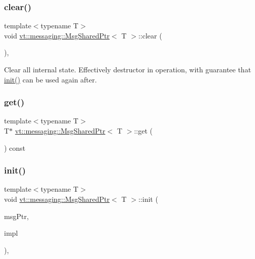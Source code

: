 \subsubsection{\texorpdfstring{clear()}{clear()}}
{\footnotesize\ttfamily template$<$typename T$>$ \\
void \hyperlink{structvt_1_1messaging_1_1_msg_shared_ptr}{vt\+::messaging\+::\+Msg\+Shared\+Ptr}$<$ T $>$\+::clear (\begin{DoxyParamCaption}{ }\end{DoxyParamCaption})\hspace{0.3cm}{\ttfamily [inline]}, {\ttfamily [private]}}

Clear all internal state. Effectively destructor in operation, with guarantee that \hyperlink{structvt_1_1messaging_1_1_msg_shared_ptr_a7117c1a8364c3267d4694b79a2f5cc6b}{init()} can be used again after. \mbox{\label{structvt_1_1messaging_1_1_msg_shared_ptr_a6e6e25e087e662d9171fa20b5092efdd}} 
\subsubsection{\texorpdfstring{get()}{get()}}
{\footnotesize\ttfamily template$<$typename T$>$ \\
T$\ast$ \hyperlink{structvt_1_1messaging_1_1_msg_shared_ptr}{vt\+::messaging\+::\+Msg\+Shared\+Ptr}$<$ T $>$\+::get (\begin{DoxyParamCaption}{ }\end{DoxyParamCaption}) const\hspace{0.3cm}{\ttfamily [inline]}}

\mbox{\label{structvt_1_1messaging_1_1_msg_shared_ptr_a7117c1a8364c3267d4694b79a2f5cc6b}} 
\subsubsection{\texorpdfstring{init()}{init()}}
{\footnotesize\ttfamily template$<$typename T$>$ \\
void \hyperlink{structvt_1_1messaging_1_1_msg_shared_ptr}{vt\+::messaging\+::\+Msg\+Shared\+Ptr}$<$ T $>$\+::init (\begin{DoxyParamCaption}\item[{T $\ast$}]{msg\+Ptr,  }\item[{\hyperlink{structvt_1_1messaging_1_1_msg_ptr_impl_base}{Msg\+Ptr\+Impl\+Base} $\ast$}]{impl }\end{DoxyParamCaption})\hspace{0.3cm}{\ttfamily [inline]}, {\ttfamily [private]}}

